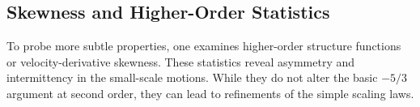 \documentclass[12pt,a4paper]{article}
\begin{document}
\subsection{Skewness and Higher-Order Statistics}

To probe more subtle properties, one examines higher-order structure functions or velocity-derivative skewness.  These statistics reveal asymmetry and intermittency in the small-scale motions.  While they do not alter the basic \(-5/3\) argument at second order, they can lead to refinements of the simple scaling laws.



\end{document}
